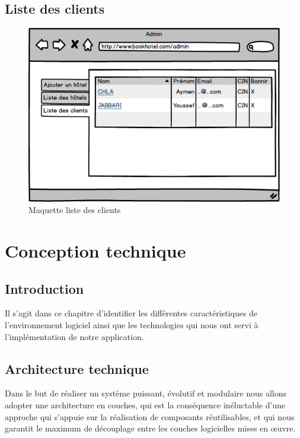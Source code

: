 \documentclass[12pt,a4paper]{report}
\begin{document}
	\section{Liste des clients}
	\vspace{2cm}
	\begin{figure}[!hbtp]
		\centering
		\includegraphics[scale=0.5]{./graphics/13.png}
		\caption{Maquette liste des clients}
	\end{figure}











		\chapter{Conception technique}
		

		\section{Introduction}
Il s’agit dans ce chapitre d’identifier les différentes caractéristiques de l’environnement logiciel ainsi que les technologies qui nous ont servi à l’implémentation de notre application.		
		
		\section{Architecture technique}
		Dans le but de réaliser un système puissant, évolutif et modulaire nous allons adopter une
architecture en couches, qui est la conséquence inéluctable d’une approche qui s’appuie sur la
réalisation de composants réutilisables, et qui nous garantit le maximum de découplage entre les
couches logicielles mises en œuvre.
		
\end{document}
